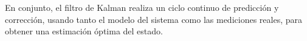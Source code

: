 \documentclass[11pt,spanish,listoffigures,listoftables]{tfgetsinf}
\begin{document}
En conjunto, el filtro de Kalman realiza un ciclo continuo de predicción y corrección, usando tanto el modelo del sistema como las mediciones reales, para obtener una estimación óptima del estado.



\end{document}
